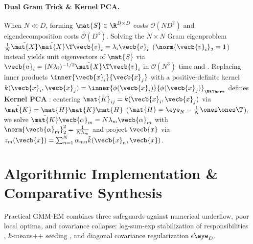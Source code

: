 \documentclass[../../../../master.tex]{subfiles}
\begin{document}
{\sloppy
\paragraph{Dual Gram Trick \& Kernel PCA.} When $N \ll D$, forming $\mat{S} \in \R^{D \times D}$ costs $\mathcal{O}(ND^2)$ and eigendecomposition costs $\mathcal{O}(D^3)$. Solving the $N \times N$ Gram eigenproblem $\frac{1}{N}\tilde{\mat{X}}\tilde{\mat{X}}\T \vecb{v}_i = \lambda_i \vecb{v}_i$ ($\norm{\vecb{v}_i}_2 = 1$) instead yields unit eigenvectors of $\mat{S}$ via $\vecb{u}_i = (N\lambda_i)^{-1/2}\tilde{\mat{X}}\T\vecb{v}_i$ in $\mathcal{O}(N^3)$ time  and . Replacing inner products $\inner{\vecb{x}_i}{\vecb{x}_j}$ with a positive-definite kernel $k(\vecb{x}_i, \vecb{x}_j) = \inner{\phi(\vecb{x}_i)}{\phi(\vecb{x}_j)}_{\Hilbert}$ defines \textbf{Kernel PCA} : centering $\mat{K}_{ij} = k(\vecb{x}_i, \vecb{x}_j)$ via $\tilde{\mat{K}} = \mat{H}\mat{K}\mat{H}$ ($\mat{H} = \eye_N - \frac{1}{N}\ones\ones\T$), we solve $\tilde{\mat{K}}\vecb{\alpha}_m = N\lambda_m \vecb{\alpha}_m$ with $\norm{\vecb{\alpha}_m}_2^2 = \frac{1}{N\lambda_m}$ and project $\vecb{x}$ via $z_m(\vecb{x}) = \sum_{n=1}^N \alpha_{mn}\tilde{k}(\vecb{x}_n, \vecb{x})$.
\par}

\section{Algorithmic Implementation \& Comparative Synthesis}
\label{sec:em:algorithms}

{\sloppy
Practical GMM-EM combines three safeguards against numerical underflow, poor local optima, and covariance collapse: log-sum-exp stabilization of responsibilities , $k$-means++ seeding , and diagonal covariance regularization $\epsilon\eye_D$.
\par}
\end{document}
